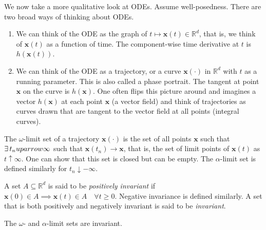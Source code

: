 We now take a more qualitative look at ODEs. Assume well-posedness. There are two broad ways of thinking about ODEs. 

\begin{enumerate}
    \item We can think of the ODE as the graph of $t \mapsto \mathbf{x}(t) \in \mathbb{R}^d$, that is, we think of $\mathbf{x}(t)$ as a function of time. The component-wise time derivative at $t$ is $h(\mathbf{x}(t))$. 
    \item We can think of the ODE as a trajectory, or a curve $\mathbf{x}(\cdot)$ in $\mathbb{R}^d$ with $t$ as a running parameter. This is also called a phase portrait. The tangent at point $\mathbf{x}$ on the curve is $h(\mathbf{x})$. One often flips this picture around and imagines a vector $h(\mathbf{x})$ at each point $\mathbf{x}$ (a vector field) and think of trajectories as curves drawn that are tangent to the vector field at all points (integral curves).
\end{enumerate}

\begin{defn}
The $\omega$-limit set of a trajectory $\mathbf{x}(\cdot)$ is the set of all points $\mathbf{x}$ such that $\exists \, t_n\\uparrow \infty$ such that $\mathbf{x}(t_n) \to \mathbf{x}$, that is, the set of limit points of $\mathbf{x}(t)$ as $t \uparrow \infty$. One can show that this set is closed but can be empty. The $\alpha$-limit set is defined similarly for $t_n \downarrow -\infty$.
\end{defn} 

\begin{defn}[Invariance]
A set $A \subseteq \mathbb{R}^d$ is said to be \emph{positively invariant} if $\mathbf{x}(0) \in A \implies \mathbf{x}(t) \in A \quad \forall t \geq 0$. Negative invariance is defined similarly. A set that is both positively and negatively invariant is said to be \emph{invariant}.
\end{defn} 

\begin{prop}
    The $\omega$- and $\alpha$-limit sets are invariant.
\end{prop}

